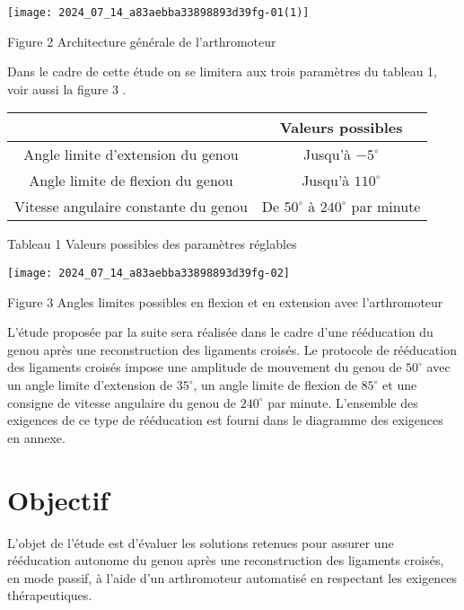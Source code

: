 \begin{center}
\texttt{[image: 2024\_07\_14\_a83aebba33898893d39fg-01(1)]}
\end{center}

Figure 2 Architecture générale de l'arthromoteur

Dans le cadre de cette étude on se limitera aux trois paramètres du tableau 1, voir aussi la figure 3 .

\begin{center}
\begin{tabular}{|c|c|}
\hline
 & Valeurs possibles \\
\hline
Angle limite d'extension du genou & Jusqu'à $-5^{\circ}$ \\
\hline
Angle limite de flexion du genou & Jusqu'à $110^{\circ}$ \\
\hline
Vitesse angulaire constante du genou & De $50^{\circ}$ à $240^{\circ}$ par minute \\
\hline
\end{tabular}
\end{center}

Tableau 1 Valeurs possibles des paramètres réglables

\begin{center}
\texttt{[image: 2024\_07\_14\_a83aebba33898893d39fg-02]}
\end{center}

Figure 3 Angles limites possibles en flexion et en extension avec l'arthromoteur

L'étude proposée par la suite sera réalisée dans le cadre d'une rééducation du genou après une reconstruction des ligaments croisés. Le protocole de rééducation des ligaments croisés impose une amplitude de mouvement du genou de $50^{\circ}$ avec un angle limite d'extension de $35^{\circ}$, un angle limite de flexion de $85^{\circ}$ et une consigne de vitesse angulaire du genou de $240^{\circ}$ par minute. L'ensemble des exigences de ce type de rééducation est fourni dans le diagramme des exigences en annexe.

\section*{Objectif}
L'objet de l'étude est d'évaluer les solutions retenues pour assurer une rééducation autonome du genou après une reconstruction des ligaments croisés, en mode passif, à l'aide d'un arthromoteur automatisé en respectant les exigences thérapeutiques.

